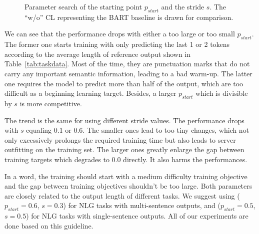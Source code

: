 \begin{figure}[h]
\begin{minipage}[t]{0.5\linewidth}
{			%
		}%
	\end{minipage}%
	\centering
	\caption{Parameter search of the starting point $p_{start}$ and the stride $s$. The ``w/o'' CL representing the BART baseline is drawn for comparison.} %
	\label{fig:stridestart}
\end{figure}


We can see that the performance drops with either a too large or too small $p_{start}$. The former one starts training with only predicting the last 1 or 2 tokens according to the average length of reference output shown in Table~\ref{tab:taskdata}. Most of the time, they are punctuation marks that do not carry any important semantic information, leading to a bad warm-up. The latter one requires the model to predict more than half of the output, which are too difficult as a beginning learning target. Besides, a larger $p_{start}$ which is divisible by $s$ is more competitive.

The trend is the same for using different stride values. The performance drops with $s$ equaling 0.1 or 0.6. 
The smaller ones lead to too tiny changes, which not only excessively prolongs the required training time but also leads to server outfitting on the training set. The larger ones greatly enlarge the gap between training targets which degrades to 0.0 directly. It also harms the performances.

In a word, the training should start with a medium difficulty training objective and the gap between training objectives shouldn't be too large. Both parameters are closely related to the output length of different tasks. We suggest using ($p_{start}=0.6$, $s=0.3$) for NLG tasks with multi-sentence outputs, and ($p_{start}=0.5$, $s=0.5$) for NLG tasks with single-sentence outputs. All of our experiments are done based on this guideline. %


